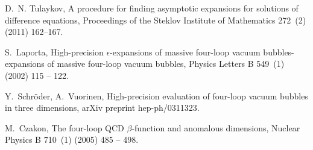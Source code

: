 \documentclass[sort&compress]{elsarticle}
\begin{document}
\begin{thebibliography}{10}
	D.~N. Tulaykov, A procedure for finding asymptotic expansions for solutions of
	difference equations, Proceedings of the Steklov Institute of Mathematics
	272~(2) (2011) 162--167.
	
	S.~Laporta, High-precision $\epsilon$-expansions of massive four-loop vacuum
	bubbles-expansions of massive four-loop vacuum bubbles, Physics Letters B
	549~(1) (2002) 115 -- 122.
	
	Y.~Schr\"oder, A.~Vuorinen, High-precision evaluation of four-loop vacuum
	bubbles in three dimensions, arXiv preprint hep-ph/0311323.
	
	M.~Czakon, The four-loop {QCD} $\beta$-function and anomalous dimensions,
	Nuclear Physics B 710~(1) (2005) 485 -- 498.
	
\end{thebibliography}
\end{document}
